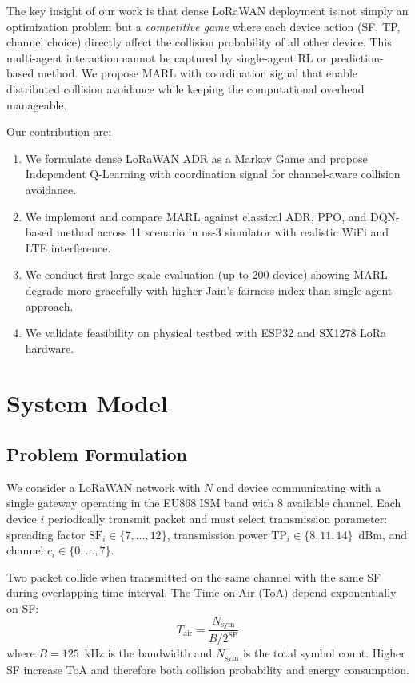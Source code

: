 \documentclass[conference]{IEEEtran}
\begin{document}
The key insight of our work is that dense LoRaWAN deployment is not simply an optimization problem but a \textit{competitive game} where each device action (SF, TP, channel choice) directly affect the collision probability of all other device. This multi-agent interaction cannot be captured by single-agent RL or prediction-based method. We propose MARL with coordination signal that enable distributed collision avoidance while keeping the computational overhead manageable.

Our contribution are:
\begin{enumerate}
    \item We formulate dense LoRaWAN ADR as a Markov Game and propose Independent Q-Learning with coordination signal for channel-aware collision avoidance.
    \item We implement and compare MARL against classical ADR, PPO, and DQN-based method across 11 scenario in ns-3 simulator with realistic WiFi and LTE interference.
    \item We conduct first large-scale evaluation (up to 200 device) showing MARL degrade more gracefully with higher Jain's fairness index than single-agent approach.
    \item We validate feasibility on physical testbed with ESP32 and SX1278 LoRa hardware.
\end{enumerate}

\section{System Model}
\label{sec:system}

\subsection{Problem Formulation}

We consider a LoRaWAN network with $N$ end device communicating with a single gateway operating in the EU868 ISM band with 8 available channel. Each device $i$ periodically transmit packet and must select transmission parameter: spreading factor $\text{SF}_i \in \{7, \ldots, 12\}$, transmission power $\text{TP}_i \in \{8, 11, 14\}$~dBm, and channel $c_i \in \{0, \ldots, 7\}$.

Two packet collide when transmitted on the same channel with the same SF during overlapping time interval. The Time-on-Air (ToA) depend exponentially on SF:
\begin{equation}
    T_{\text{air}} = \frac{N_{\text{sym}}}{B / 2^{\text{SF}}}
\end{equation}
where $B = 125$~kHz is the bandwidth and $N_{\text{sym}}$ is the total symbol count. Higher SF increase ToA and therefore both collision probability and energy consumption.
\end{document}
